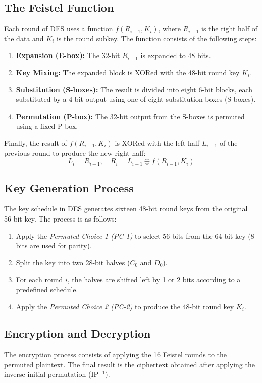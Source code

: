 \documentclass[12pt]{article}
\begin{document}
\subsection*{The Feistel Function}
Each round of DES uses a function \( f(R_{i-1}, K_i) \), where \( R_{i-1} \) is the right half of the data and \( K_i \) is the round subkey. The function consists of the following steps:

\begin{enumerate}
    \item \textbf{Expansion (E-box):} The 32-bit \( R_{i-1} \) is expanded to 48 bits.
    \item \textbf{Key Mixing:} The expanded block is XORed with the 48-bit round key \( K_i \).
    \item \textbf{Substitution (S-boxes):} The result is divided into eight 6-bit blocks, each substituted by a 4-bit output using one of eight substitution boxes (S-boxes).
    \item \textbf{Permutation (P-box):} The 32-bit output from the S-boxes is permuted using a fixed P-box.
\end{enumerate}

Finally, the result of \( f(R_{i-1}, K_i) \) is XORed with the left half \( L_{i-1} \) of the previous round to produce the new right half:
\[
L_i = R_{i-1}, \quad R_i = L_{i-1} \oplus f(R_{i-1}, K_i)
\]

\subsection*{Key Generation Process}
The key schedule in DES generates sixteen 48-bit round keys from the original 56-bit key. The process is as follows:

\begin{enumerate}
    \item Apply the \textit{Permuted Choice 1 (PC-1)} to select 56 bits from the 64-bit key (8 bits are used for parity).
    \item Split the key into two 28-bit halves (\( C_0 \) and \( D_0 \)).
    \item For each round \( i \), the halves are shifted left by 1 or 2 bits according to a predefined schedule.
    \item Apply the \textit{Permuted Choice 2 (PC-2)} to produce the 48-bit round key \( K_i \).
\end{enumerate}

\subsection*{Encryption and Decryption}
The encryption process consists of applying the 16 Feistel rounds to the permuted plaintext. The final result is the ciphertext obtained after applying the inverse initial permutation (IP$^{-1}$).
\end{document}
